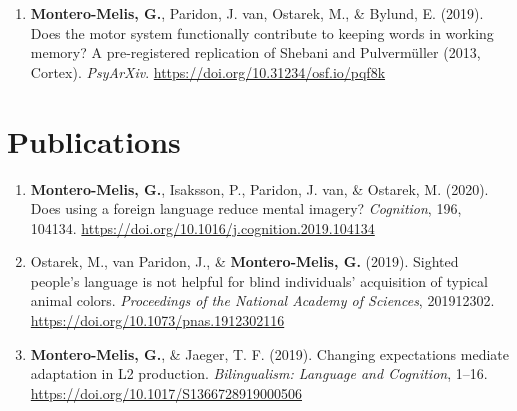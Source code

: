 \documentclass[margin, 11pt]{res} %
\begin{document}
\begin{resume}


\begin{enumerate}

	\item \textbf{Montero-Melis, G.}, Paridon, J. van, Ostarek, M., \& Bylund, E. (2019). Does the motor system functionally contribute to keeping words in working memory? A pre-registered replication of Shebani and Pulvermüller (2013, Cortex). \emph{PsyArXiv}. \url{https://doi.org/10.31234/osf.io/pqf8k}

\end{enumerate}


\section{\sc Publications}



\begin{enumerate}

	\item \textbf{Montero-Melis, G.}, Isaksson, P., Paridon, J. van, \& Ostarek, M. (2020). Does using a foreign language reduce mental imagery? \emph{Cognition}, 196, 104134. \url{https://doi.org/10.1016/j.cognition.2019.104134}


	\item Ostarek, M., van Paridon, J., \& \textbf{Montero-Melis, G.} (2019). Sighted people’s language is not helpful for blind individuals’ acquisition of typical animal colors. \emph{Proceedings of the National Academy of Sciences}, 201912302. \url{https://doi.org/10.1073/pnas.1912302116}

	\item \textbf{Montero-Melis, G.}, \& Jaeger, T. F. (2019). Changing expectations mediate adaptation in L2 production. \emph{Bilingualism: Language and Cognition}, 1–16. \url{https://doi.org/10.1017/S1366728919000506}


\end{enumerate}
\end{resume}
\end{document}
